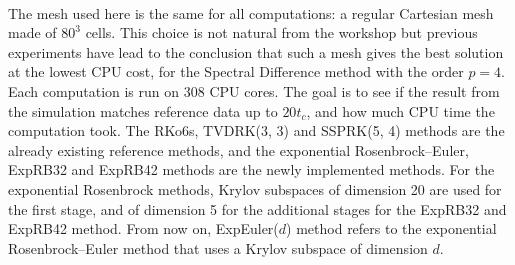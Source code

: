       \paragraph{}
      The mesh used here is the same for all computations: a regular Cartesian mesh made of $80^3$ cells.
      This choice is not natural from the workshop but previous experiments have lead to the conclusion that such a mesh gives the best solution at the lowest CPU cost, for the Spectral Difference method with the order $p = 4$.
      Each computation is run on 308 CPU cores.
      The goal is to see if the result from the simulation matches reference data up to $20 t_c$, and how much CPU time the computation took.
      The RKo6s, TVDRK(3, 3) and SSPRK(5, 4) methods are the already existing reference methods, and the exponential Rosenbrock--Euler, ExpRB32 and ExpRB42 methods are the newly implemented methods.
      For the exponential Rosenbrock methods, Krylov subspaces of dimension 20 are used for the first stage, and of dimension 5 for the additional stages for the ExpRB32 and ExpRB42 method.
      From now on, ExpEuler($d$) method refers to the exponential Rosenbrock--Euler method that uses a Krylov subspace of dimension $d$.


